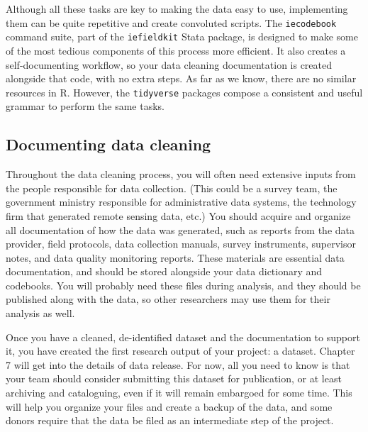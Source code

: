 Although all these tasks are key to making the data easy to use,
implementing them can be quite repetitive and create convoluted scripts.
The \texttt{iecodebook} command suite, part of the \texttt{iefieldkit} Stata package,
is designed to make some of the most tedious components of this process more efficient.
It also creates a self-documenting workflow,
so your data cleaning documentation is created alongside that code,
with no extra steps.
As far as we know, there are no similar resources in R.
However, the \texttt{tidyverse} packages
compose a consistent and useful grammar to perform the same tasks.


\subsection{Documenting data cleaning}
Throughout the data cleaning process,
you will often need extensive inputs from the people responsible for data collection.
(This could be a survey team, the government ministry responsible for administrative data systems,
the technology firm that generated remote sensing data, etc.)
You should acquire and organize all documentation of how the data was generated, such as
reports from the data provider, field protocols, data collection manuals, survey instruments,
supervisor notes, and data quality monitoring reports.
These materials are essential data documentation,
and should be stored alongside your data dictionary and codebooks.
You will probably need these files during analysis,
and they should be published along with the data,
so other researchers may use them for their analysis as well.

Once you have a cleaned, de-identified dataset and the documentation to support it,
you have created the first research output of your project: a dataset.
Chapter 7 will get into the details of data release.
For now, all you need to know is that your team 
should consider submitting this dataset for publication,
or at least archiving and cataloguing,
even if it will remain embargoed for some time.
This will help you organize your files and create a backup of the data,
and some donors require that the data be filed as an intermediate step of the project.


